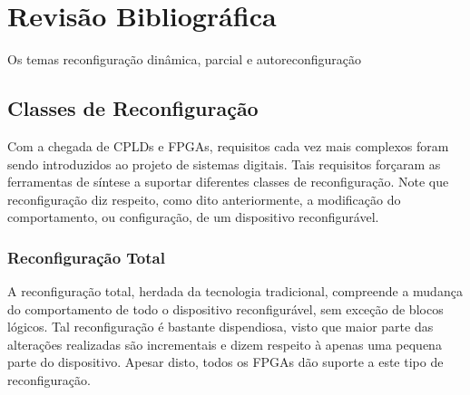 \documentclass[11pt,a4paper,oneside]{book}
\begin{document}
	\frontmatter
	\tableofcontents
	\mainmatter
	
\fi
                      
\chapter{Revis\~{a}o Bibliogr\'{a}fica}\label{CapRevisaoBibliografica}


\vspace{0.8cm}
Os temas reconfiguração dinâmica, parcial e autoreconfiguração 

\section{Classes de Reconfigura\c{c}\~ao}
Com a chegada de CPLDs e FPGAs, requisitos cada vez mais complexos foram sendo introduzidos ao projeto de sistemas digitais.
Tais requisitos for\c{c}aram as ferramentas de s\'i­ntese a suportar diferentes classes de reconfigura\c{c}\~ao.
Note que reconfigura\c{c}\~ao diz respeito, como dito anteriormente, a modifica\c{c}\~ao do comportamento, ou configura\c{c}\~ao, de um dispositivo reconfigur\'avel.

\subsection{Reconfigura\c{c}\~ao Total}
A reconfigura\c{c}\~ao total, herdada da tecnologia tradicional, compreende a mudan\c{c}a do comportamento de todo o dispositivo reconfigur\'avel, sem exce\c{c}\~ao de blocos l\'ogicos.
Tal reconfigura\c{c}\~ao \'e bastante dispendiosa, visto que maior parte das alterações realizadas são incrementais e dizem respeito \`a apenas uma pequena parte do dispositivo.
Apesar disto, todos os FPGAs d\~ao suporte a este tipo de reconfigura\c{c}\~ao.
\end{document}

